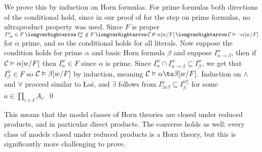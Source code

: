 We prove this by induction on Horn formulas.
For prime formulas both directions of the conditional hold, since in our proof of  for the step on prime formulas, no ultraproduct property was used.
Since $F$ is proper $I^w_{\neg\alpha}\in F\implies I^w_\alpha\notin F\implies{\cal C}\nvDash\alpha[w/F]\implies{\cal C}\vDash\neg\alpha[w/F]$ for $\alpha$ prime, and so the conditional holds for all
literals.
Now suppose the condition holds for prime $\alpha$ and basic Horn formula $\beta$ and suppose $I^w_{\alpha\to\beta}$, then if ${\cal C}\vDash\alpha[w/F]$ then $I^w_\alpha\in F$ since $\alpha$ is prime.
Since $I^w_\alpha\cap I^w_{\alpha\to\beta}\subseteq I^w_\beta$, we get that $I^w_\beta\in F$ so ${\cal C}\vDash\beta[w/F]$ by induction, meaning ${\cal C}\vDash\alpha\to\beta[w/F]$.
Induction on $\land$ and $\forall$ proceed similar to \L o\'s, and $\exists$ follows from $I^w_{\exists x\beta}\subseteq I^{w^a_x}_\beta$ for some $a\in\prod_{i\in I}A_i$.
\qed

This means that the model classes of Horn theories are closed under reduced products, and in particular direct products.
The converse holds as well: every class of models closed under reduced products is a Horn theory, but this is significantly more challenging to prove.

